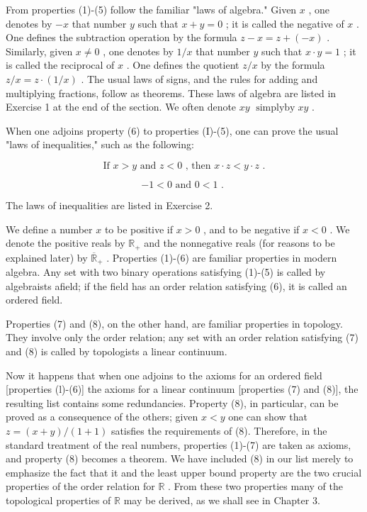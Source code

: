 From properties (1)-(5) follow the familiar "laws of algebra." Given \(x\) , one denotes by \(- x\) that number \(y\) such that \(x + y = 0\) ; it is called the negative of \(x\) . One defines the subtraction operation by the formula \(z - x = z + \left( {-x}\right)\) . Similarly, given \(x \neq  0\) , one denotes by \(1/x\) that number \(y\) such that \(x \cdot  y = 1\) ; it is called the reciprocal of \(x\) . One defines the quotient \(z/x\) by the formula \(z/x = z \cdot  \left( {1/x}\right)\) . The usual laws of signs, and the rules for adding and multiplying fractions, follow as theorems. These laws of algebra are listed in Exercise 1 at the end of the section. We often denote \(xy\)  \(\operatorname{simplyby}{xy}\) .

When one adjoins property (6) to properties (I)-(5), one can prove the usual "laws of inequalities," such as the following:

\[
\text{ If }x > y\text{ and }z < 0\text{ , then }x \cdot  z < y \cdot  z\text{ . }
\]

\[
- 1 < 0\text{ and }0 < 1\text{ . }
\]

The laws of inequalities are listed in Exercise 2.

We define a number \(x\) to be positive if \(x > 0\) , and to be negative if \(x < 0\) . We denote the positive reals by \({\mathbb{R}}_{ + }\) and the nonnegative reals (for reasons to be explained later) by \({\overline{\mathbb{R}}}_{ + }\) . Properties (1)-(6) are familiar properties in modern algebra. Any set with two binary operations satisfying (1)-(5) is called by algebraists afield; if the field has an order relation satisfying (6), it is called an ordered field.

Properties (7) and (8), on the other hand, are familiar properties in topology. They involve only the order relation; any set with an order relation satisfying (7) and (8) is called by topologists a linear continuum.

Now it happens that when one adjoins to the axioms for an ordered field [properties (l)-(6)] the axioms for a linear continuum [properties (7) and (8)], the resulting list contains some redundancies. Property (8), in particular, can be proved as a consequence of the others; given \(x < y\) one can show that \(z = \left( {x + y}\right) /\left( {1 + 1}\right)\) satisfies the requirements of (8). Therefore, in the standard treatment of the real numbers, properties (1)-(7) are taken as axioms, and property (8) becomes a theorem. We have included (8) in our list merely to emphasize the fact that it and the least upper bound property are the two crucial properties of the order relation for \(\mathbb{R}\) . From these two properties many of the topological properties of \(\mathbb{R}\) may be derived, as we shall see in Chapter 3.

